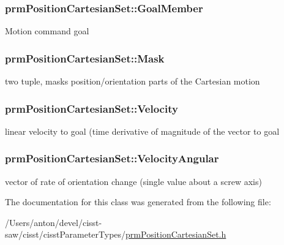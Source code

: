 \subsubsection[{Goal\+Member}]{ prm\+Position\+Cartesian\+Set\+::\+Goal\+Member\hspace{0.3cm}{\ttfamily [protected]}}\label{classprm_position_cartesian_set_afa8b6da3bc44612f35332ad2c8d09bc1}
Motion command goal \hypertarget{classprm_position_cartesian_set_aa9dcc7db15cd8fc1417d0db5ddc0aec7}{}
\subsubsection[{Mask}]{ prm\+Position\+Cartesian\+Set\+::\+Mask\hspace{0.3cm}{\ttfamily [protected]}}\label{classprm_position_cartesian_set_aa9dcc7db15cd8fc1417d0db5ddc0aec7}
two tuple, masks position/orientation parts of the Cartesian motion \hypertarget{classprm_position_cartesian_set_a218381fcba3a988483998be35d62e855}{}
\subsubsection[{Velocity}]{ prm\+Position\+Cartesian\+Set\+::\+Velocity\hspace{0.3cm}{\ttfamily [protected]}}\label{classprm_position_cartesian_set_a218381fcba3a988483998be35d62e855}
linear velocity to goal (time derivative of magnitude of the vector to goal \hypertarget{classprm_position_cartesian_set_a3dc6dc353b6f68440b1784352aba06d9}{}
\subsubsection[{Velocity\+Angular}]{ prm\+Position\+Cartesian\+Set\+::\+Velocity\+Angular\hspace{0.3cm}{\ttfamily [protected]}}\label{classprm_position_cartesian_set_a3dc6dc353b6f68440b1784352aba06d9}
vector of rate of orientation change (single value about a screw axis) 

The documentation for this class was generated from the following file\+:\begin{DoxyCompactItemize}
\item 
/\+Users/anton/devel/cisst-\/saw/cisst/cisst\+Parameter\+Types/\hyperlink{prm_position_cartesian_set_8h}{prm\+Position\+Cartesian\+Set.\+h}\end{DoxyCompactItemize}
